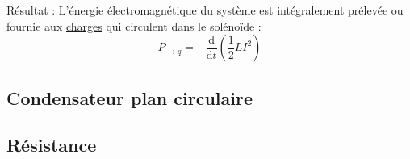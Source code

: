 \begin{itemize}
      Résultat : L'énergie électromagnétique du système est intégralement prélevée ou fournie aux \underline{charges} qui circulent dans le solénoïde : 
      \begin{equation}
        P _{\to q} = - \frac{\mathrm{d}}{\mathrm{d}t}  \left( \frac{1}{2}  L I ^{2} \right)
      \end{equation}
      




      

\end{itemize}


\subsection{Condensateur plan circulaire} %
\label{sub:Condensateur plan circulaire}

\subsection{Résistance} %
\label{sub:Résistance}


